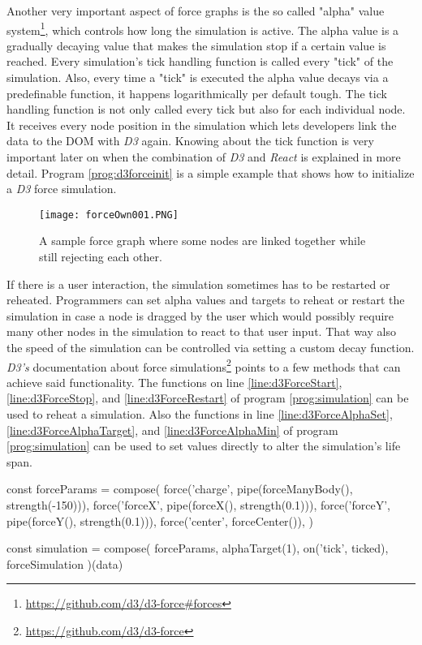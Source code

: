 Another very important aspect of force graphs is the so called "alpha" value system\footnote{\url{https://github.com/d3/d3-force\#forces}}, which controls how long the simulation is active. The alpha value is a gradually decaying value that makes the simulation stop if a certain value is reached. Every simulation's tick handling function is called every "tick" of the simulation. Also, every time a "tick" is executed the alpha value decays via a predefinable function, it happens logarithmically per default tough. The tick handling function is not only called every tick but also for each individual node. It receives every node position in the simulation which lets developers link the data to the DOM with \emph{D3} again. Knowing about the tick function is very important later on when the combination of \emph{D3} and \emph{React} is explained in more detail. Program \ref{prog:d3forceinit} is a simple example that shows how to initialize a \emph{D3} force simulation.

\begin{figure}
  \centering
  \texttt{[image: forceOwn001.PNG]}
  \caption{A sample force graph where some nodes are linked together while still rejecting each other.}
  \label{fig:force005}
\end{figure}

If there is a user interaction, the simulation sometimes has to be restarted or reheated. Programmers can set alpha values and targets to reheat or restart the simulation in case a node is dragged by the user which would possibly require many other nodes in the simulation to react to that user input. That way also the speed of the simulation can be controlled via setting a custom decay function. \emph{D3's} documentation about force simulations\footnote{\url{https://github.com/d3/d3-force}} points to a few methods that can achieve said functionality. The functions on line \ref{line:d3ForceStart}, \ref{line:d3ForceStop}, and \ref{line:d3ForceRestart} of program \ref{prog:simulation} can be used to reheat a simulation. Also the functions in line \ref{line:d3ForceAlphaSet}, \ref{line:d3ForceAlphaTarget}, and \ref{line:d3ForceAlphaMin} of program \ref{prog:simulation} can be used to set values directly to alter the simulation's life span.

\begin{program}
\caption{\emph{D3} written in a fictional functional way}
\label{prog:d3functional}
\begin{JsCode}
const forceParams = compose(
  force('charge', pipe(forceManyBody(), strength(-150))),
  force('forceX', pipe(forceX(), strength(0.1))),
  force('forceY', pipe(forceY(), strength(0.1))),
  force('center', forceCenter()),
)

const simulation = compose(
  forceParams,
  alphaTarget(1),
  on('tick', ticked),
  forceSimulation
)(data)
\end{JsCode}
\end{program}

